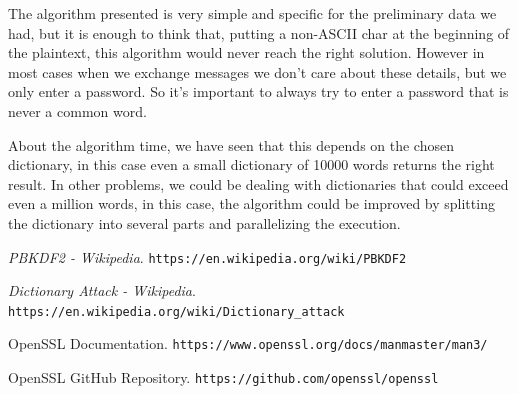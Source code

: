 \documentclass[11pt]{article}
\begin{document}
The algorithm presented is very simple and specific for the preliminary data we had, but it is enough to think that, putting a non-ASCII char at the beginning of the plaintext, this algorithm would never reach the right solution. However in most cases when we exchange messages we don't care about these details, but we only enter a password. So it's important to always try to enter a password that is never a common word.

About the algorithm time, we have seen that this depends on the chosen dictionary, in this case even a small dictionary of 10000 words returns the right result. In other problems, we could be dealing with dictionaries that could exceed even a million words, in this case, the algorithm could be improved by splitting the dictionary into several parts and parallelizing the execution.

\begin{thebibliography}{99}

{\em PBKDF2 - Wikipedia}.
 \verb|https://en.wikipedia.org/wiki/PBKDF2|

{\em Dictionary Attack - Wikipedia}.
 \verb|https://en.wikipedia.org/wiki/Dictionary_attack|

OpenSSL Documentation.
\verb|https://www.openssl.org/docs/manmaster/man3/|

OpenSSL GitHub Repository.
\verb|https://github.com/openssl/openssl|

\end{thebibliography}
\end{document}
